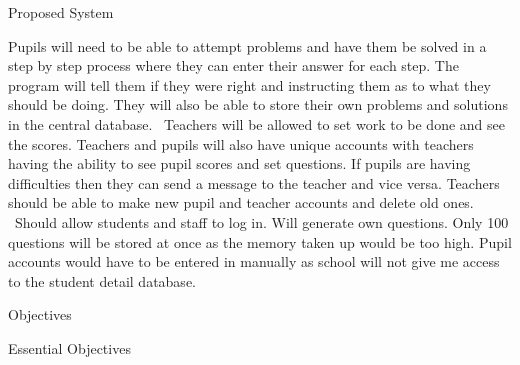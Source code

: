 \documentclass{article}
\begin{document}
\bigskip


\bigskip


\bigskip

Proposed System


\bigskip

Pupils will need to be able to attempt problems and have them be solved in a step by step process where they can enter their answer for each step. The program will tell them if they were right and instructing them as to what they should be doing. They will also be able to store their own problems and solutions in the central database. \ Teachers will be allowed to set work to be done and see the scores. Teachers and pupils will also have unique accounts with teachers having the ability to see pupil scores and set questions. If pupils are having difficulties then they can send a message to the teacher and vice versa. Teachers should be able to make new pupil and teacher accounts and delete old ones. \ Should allow students and staff to log in. Will generate own questions. Only 100 questions will be stored at once as the memory taken up would be too high. Pupil accounts would have to be entered in manually as school will not give me access to the student detail database.


\bigskip

Objectives


\bigskip

Essential Objectives
\end{document}
